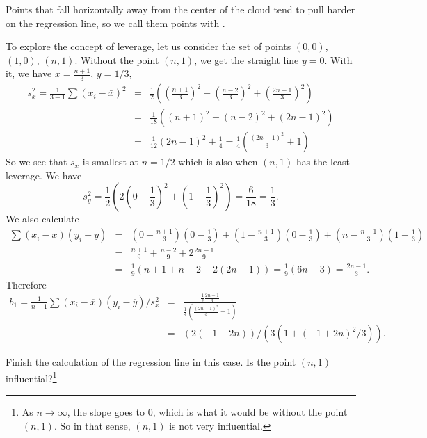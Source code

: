 \begin{termBox}{
Points that fall horizontally away from the center of the cloud tend to pull harder on the regression line, so we call them points with .}
\end{termBox}

To explore the concept of leverage, let us consider the set of points $(0,0)$, $(1,0)$, $(n,1)$.
Without the point $(n,1)$, we get the straight line $y=0$.
With it, we have $\bar x=\frac{n+1}3$, $\bar y=1/3$,
\begin{eqnarray*}
	s_x^2 = \frac1{3-1}\sum\left(x_i-\bar x\right)^2 &=& \frac12\left(\left(\frac{n+1}3\right)^2+\left(\frac{n-2}3\right)^2+\left(\frac{2n-1}3\right)^2\right)\\
	&=& \frac1{18}\left(\left(n+1\right)^2+\left(n-2\right)^2+\left(2n-1\right)^2\right)\\
	&=& \frac1{12} \left(2 n - 1\right)^2 + \frac14 = \frac14\left(\frac{\left(2n-1\right)^2}3+1\right)
\end{eqnarray*}
So we see that $s_x$ is smallest at $n=1/2$ which is also when $(n,1)$ has the least leverage.
We have
\[
	s_y^2 = \frac12\left(2\left(0-\frac13\right)^2+\left(1-\frac13\right)^2\right)=\frac6{18}=\frac13.
\]
We also calculate
\begin{eqnarray*}
	\sum \left(x_i-\overline x\right)\left(y_i-\bar y\right) &=& \left(0-\frac{n+1}3\right)\left(0-\frac13\right) + \left(1-\frac{n+1}3\right)\left(0-\frac13\right) + \left(n-\frac{n+1}3\right)\left(1-\frac13\right)\\
	&=& \frac{n+1}9  + \frac{n-2}9  +2\frac{2n-1}9 \\
	&=& \frac19\left(n+1+n-2 +2\left(2n-1\right)\right) = \frac19\left(6n-3\right)=\frac{2n-1}3.
\end{eqnarray*}
Therefore
\begin{eqnarray*}
	b_1=\frac1{n-1}\sum \left(x_i-\overline x\right)\left(y_i-\overline y\right)/s_x^2 &=& \frac{\frac12 \frac{2n-1}3}{\frac14\left(\frac{\left(2n-1\right)^2}3+1\right)}\\
	&=&\left(2 \left(-1 + 2 n\right)\right)/\left(3 \left(1 + \left(-1 + 2 n\right)^2/3\right)\right).
\end{eqnarray*}
\begin{exercise}
Finish the calculation of the regression line in this case. Is the point $(n,1)$ influential?\footnote{As $n\to\infty$, the slope goes to 0, which is what it would be without the point $(n,1)$. So in that sense, $(n,1)$ is not very influential.}
\end{exercise}
